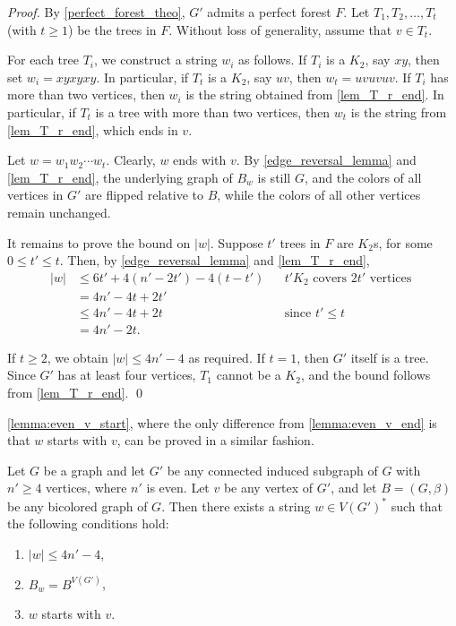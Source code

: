 \documentclass[runningheads,orivec]{llncs}
\begin{document}
\begin{proof}
By \autoref{perfect_forest_theo}, $G'$ admits a perfect forest $F$. Let $T_1, T_2, \ldots, T_t$ (with $t \geq 1$) be 
the trees in $F$. Without loss of generality, assume that $v \in T_t$.

For each tree $T_i$, we construct a string $w_i$ as follows.  
If $T_i$ is a $K_2$, say $xy$, then set $w_i = xyxyxy$. In particular, if $T_t$ is a $K_2$, say $uv$, then $w_t = uvuvuv$.  
If $T_i$ has more than two vertices, then $w_i$ is the string obtained from \autoref{lem_T_r_end}. In particular, if $T_t$ is a tree with more than two vertices, then $w_t$ is the string from \autoref{lem_T_r_end}, which ends in $v$.  

Let $w = w_1w_2\cdots w_t$. Clearly, $w$ ends with $v$. By \autoref{edge_reversal_lemma} and \autoref{lem_T_r_end}, the underlying graph of $B_w$ is still $G$, and the colors of all vertices in $G'$ are flipped relative to $B$, while the colors of all other vertices remain unchanged.

It remains to prove the bound on $|w|$. Suppose $t'$ trees in $F$ are $K_2$s, for some $0 \leq t' \leq t$. Then, by \autoref{edge_reversal_lemma} and \autoref{lem_T_r_end},  
\begin{align*}
|w| &\leq 6t' + 4(n' - 2t') - 4(t - t') && \text{$t'K_2$ covers $2t'$ vertices }\\
    &= 4n' - 4t + 2t' \\
    &\leq 4n' - 4t + 2t && \text{since $t' \leq t$} \\
    &= 4n' - 2t.
\end{align*}

If $t \geq 2$, we obtain $|w| \leq 4n' - 4$ as required.  
If $t = 1$, then $G'$ itself is a tree. Since $G'$ has at least four vertices, $T_1$ cannot be a $K_2$, and the bound follows from \autoref{lem_T_r_end}.
\qed
\end{proof}

\autoref{lemma:even_v_start}, where the only difference from \autoref{lemma:even_v_end} is that $w$ starts with $v$, can be proved in a similar fashion.

\begin{lemma}\label{lemma:even_v_start}
Let $G$ be a graph and let $G'$ be any connected induced subgraph of $G$ with $n' \geq 4$ vertices, where $n'$ is even. 
Let $v$ be any vertex of $G'$, and let $B = (G, \beta)$ be any bicolored graph of $G$. 
Then there exists a string $w \in V(G')^*$ such that the following conditions hold:
\begin{enumerate}
    \item $|w| \leq 4n'-4$,
    \item $B_w = B^{V(G')}$,
    \item $w$ starts with $v$.
\end{enumerate}
\end{lemma}
\end{document}
